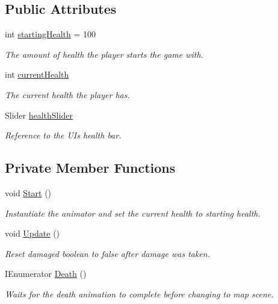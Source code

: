 \subsection*{Public Attributes}
\begin{DoxyCompactItemize}
\item 
int \mbox{\hyperlink{class_enemy_health_a38679a6db9f4c1a03512494520bd7016}{starting\+Health}} = 100
\begin{DoxyCompactList}\small\item\em The amount of health the player starts the game with. \end{DoxyCompactList}\item 
int \mbox{\hyperlink{class_enemy_health_a87d62a02a46acef77ee2cefbb7beda64}{current\+Health}}
\begin{DoxyCompactList}\small\item\em The current health the player has. \end{DoxyCompactList}\item 
Slider \mbox{\hyperlink{class_enemy_health_a4b880bdd617c88f258fc302bafd3dff9}{health\+Slider}}
\begin{DoxyCompactList}\small\item\em Reference to the UI\textquotesingle{}s health bar. \end{DoxyCompactList}\end{DoxyCompactItemize}
\subsection*{Private Member Functions}
\begin{DoxyCompactItemize}
\item 
void \mbox{\hyperlink{class_enemy_health_a54cf9f16d11c4af18d2cabcea9d937e6}{Start}} ()
\begin{DoxyCompactList}\small\item\em Instantiate the animator and set the current health to starting health. \end{DoxyCompactList}\item 
void \mbox{\hyperlink{class_enemy_health_ae53051c82f68739b6ed749334e3c1d68}{Update}} ()
\begin{DoxyCompactList}\small\item\em Reset damaged boolean to false after damage was taken. \end{DoxyCompactList}\item 
I\+Enumerator \mbox{\hyperlink{class_enemy_health_a4f03b1ab160d8488f3e599384e5dcdbd}{Death}} ()
\begin{DoxyCompactList}\small\item\em Waits for the death animation to complete before changing to map scene. \end{DoxyCompactList}\end{DoxyCompactItemize}
